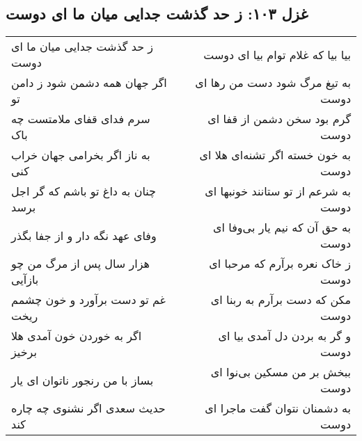 \begin{center}
\section*{غزل ۱۰۳: ز حد گذشت جدایی میان ما ای دوست}
\label{sec:103}
\begin{longtable}{l p{0.5cm} r}
ز حد گذشت جدایی میان ما ای دوست
&&
بیا بیا که غلام توام بیا ای دوست
\\
اگر جهان همه دشمن شود ز دامن تو
&&
به تیغ مرگ شود دست من رها ای دوست
\\
سرم فدای قفای ملامتست چه باک
&&
گرم بود سخن دشمن از قفا ای دوست
\\
به ناز اگر بخرامی جهان خراب کنی
&&
به خون خسته اگر تشنه‌ای هلا ای دوست
\\
چنان به داغ تو باشم که گر اجل برسد
&&
به شرعم از تو ستانند خونبها ای دوست
\\
وفای عهد نگه دار و از جفا بگذر
&&
به حق آن که نیم یار بی‌وفا ای دوست
\\
هزار سال پس از مرگ من چو بازآیی
&&
ز خاک نعره برآرم که مرحبا ای دوست
\\
غم تو دست برآورد و خون چشمم ریخت
&&
مکن که دست برآرم به ربنا ای دوست
\\
اگر به خوردن خون آمدی هلا برخیز
&&
و گر به بردن دل آمدی بیا ای دوست
\\
بساز با من رنجور ناتوان ای یار
&&
ببخش بر من مسکین بی‌نوا ای دوست
\\
حدیث سعدی اگر نشنوی چه چاره کند
&&
به دشمنان نتوان گفت ماجرا ای دوست
\\
\end{longtable}
\end{center}
